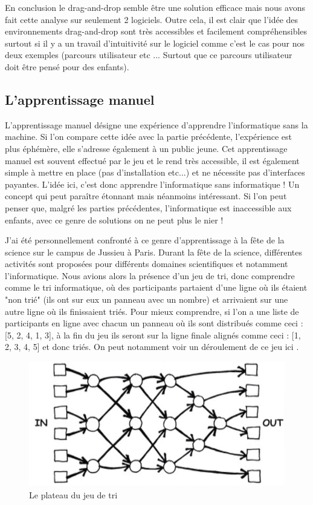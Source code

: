 En conclusion le drag-and-drop semble être une solution efficace mais nous avons fait cette analyse sur seulement 2 logiciels. Outre cela, il est clair que l'idée des environnements drag-and-drop sont très accessibles et facilement compréhensibles surtout si il y a un travail d'intuitivité sur le logiciel comme c'est le cas pour nos deux exemples (parcours utilisateur etc ... Surtout que ce parcours utilisateur doit être pensé pour des enfants).

\newpage


\subsection{L'apprentissage manuel}

L'apprentissage manuel désigne une expérience d'apprendre l'informatique sans la machine. Si l'on compare cette idée avec la partie précédente, l'expérience est plus éphémère, elle s'adresse également à un public jeune. Cet apprentissage manuel est souvent effectué par le jeu et le rend très accessible, il est également 
simple à mettre en place (pas d'installation etc...) et ne nécessite pas d'interfaces payantes. L'idée ici, c'est donc apprendre l'informatique sans informatique ! Un concept qui peut paraître étonnant mais néanmoins intéressant. Si l'on peut penser que, malgré les parties précédentes, l'informatique est inaccessible aux enfants, avec ce genre de solutions on ne peut plus le nier !

J'ai été personnellement confronté à ce genre d'apprentissage à la fête de la science sur le campus de Jussieu à Paris. Durant la fête de la science, différentes activités sont proposées pour différents domaines scientifiques et notamment l'informatique. Nous avions alors la présence d'un jeu de tri, donc comprendre comme le tri informatique, où des participants partaient d'une ligne où ils étaient "non trié" (ils ont sur eux un panneau avec un nombre) et arrivaient sur une autre ligne où ils finissaient triés. Pour mieux comprendre, si l'on a une liste de participants en ligne avec chacun un panneau où ils sont distribués comme ceci : [5, 2, 4, 1, 3], à la fin du jeu ils seront sur la ligne finale alignés comme ceci : [1, 2, 3, 4, 5] et donc triés. On peut notamment voir un déroulement de ce jeu ici \cite{28} .

\begin{figure}[!htb]
  \centering
  \includegraphics[width=115mm,scale=0.5]{images/tri.PNG}
  \caption{Le plateau du jeu de tri}
  \label{fig:boat1}
\end{figure}

